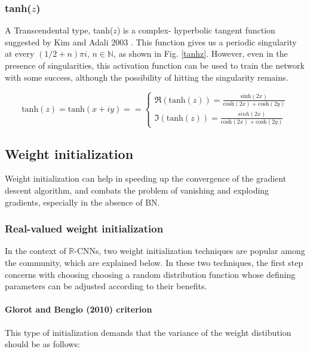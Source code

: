 


\subsubsection{tanh($z$)}
A Transcendental type, tanh($z$) is a complex- hyperbolic tangent function suggested by Kim and Adali 2003 \cite{kim2003approximation}.
This function gives us a periodic singularity at every
$(1/2 + n)\pi i$, $n \in \mathbb{N}$, as shown in Fig. \ref{tanhz}. However, even in the presence of singularities, this activation function can be used to train the network with some success, although the possibility of hitting the singularity remains.

\begin{equation}
\mathrm{tanh}(z) = \mathrm{tanh}(x+iy) = 
{}=\begin{cases} \Re(\mathrm{tanh}(z)) = \frac{\mathrm{sinh}(2x)}{\mathrm{cosh}(2x)+\mathrm{cosh}(2y)} \\ \Im(\mathrm{tanh}(z)) = \frac{sinh(2x)}{\mathrm{cosh}(2x)+\mathrm{cosh}(2y)} \end{cases}
\end{equation}


 \subsection{Weight initialization}
 Weight initialization can help in speeding up the convergence of the gradient descent algorithm, and combats the problem of vanishing and exploding gradients, especially in the absence of BN. 
 
 
 \subsubsection{Real-valued weight initialization}\label{rvwi}
 In the context of $\mathbb{R}$-CNNs, two weight initialization techniques are popular among the community, which are explained below. In these two techniques, the first step concerns with choosing choosing a random distribution function whose defining parameters can be adjusted according to their benefits.
 \paragraph{Glorot and Bengio (2010) criterion}
 This type of initialization demands that the variance of the weight distibution should be as follows:

